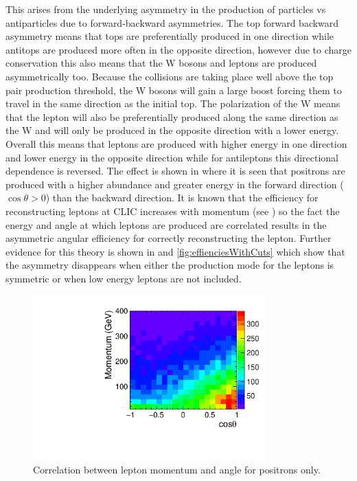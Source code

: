 This arises from the underlying asymmetry in the production of particles vs antiparticles due to forward-backward asymmetries. The top forward backward asymmetry means that tops are preferentially produced in one direction while antitops are produced more often in the opposite direction, however due to charge conservation this also means that the W bosons and leptons are produced asymmetrically too. Because the collisions are taking place well above the top pair production threshold, the W bosons will gain a large boost forcing them to travel in the same direction as the initial top. The polarization of the W means that the lepton will also be preferentially produced along the same direction as the W and will only be produced in the opposite direction with a lower energy. Overall this means that leptons are produced with higher energy in one direction and lower energy in the opposite direction while for antileptons this directional dependence is reversed. The effect is shown in  where it is seen that positrons are produced with a higher abundance and greater energy in the forward direction ($\cos\theta>0$) than the backward direction. It is known that the efficiency for reconstructing leptons at CLIC increases with momentum (see ) so the fact the energy and angle at which leptons are produced are correlated results in the asymmetric angular efficiency for correctly reconstructing the lepton. Further evidence for this theory is shown in  and \ref{fig:effienciesWithCuts} which show that the asymmetry disappears when either the production mode for the leptons is symmetric or when low energy leptons are not included.

\begin{figure}
  \centering
  \includegraphics[width=0.8\textwidth]{TopAnalysis/figures/MomentumVsTheta.pdf}
  \caption[Lepton Momentum Vs Angle]{Correlation between lepton momentum and angle for positrons only.}
  \label{fig:efficiency2d}
\end{figure}

